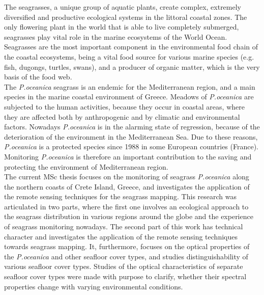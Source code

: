 \documentclass[11pt]{article}
\begin{document}
The seagrasses, a unique group of aquatic plants, create complex, extremely diversified and productive ecological systems in the littoral coastal zones. The only flowering plant in the world that is able to live completely submerged, seagrasses play vital role in the marine ecosystems of the World Ocean. Seagrasses are the most important component in the environmental food chain of the coastal ecosystems, being a vital food source for various marine species (e.g. fish, dugongs, turtles, swans), and a producer of organic matter, which is the very basis of the food web.\\
The \textit{P.oceanica} seagrass is an endemic for the Mediterranean region, and a main species in the marine coastal environment of Greece. Meadows of \textit{P.oceanica} are subjected to the human activities, because they occur in coastal areas, where they are affected both by anthropogenic and by climatic and environmental factors. Nowadays \textit{P.oceanica} is in the alarming state of regression, because of the deterioration of the environment in the Mediterranean Sea. Due to these reasons, \textit{P.oceanica} is a protected species since 1988 in some European countries (France). Monitoring \textit{P.oceanica} is therefore an important contribution to the saving and protecting the environment of Mediterranean region.\\
The current MSc thesis focuses on the monitoring of seagrass \textit{P.oceanica} along the northern coasts of Crete Island, Greece, and investigates the application of the remote sensing techniques for the seagrass mapping. 
This research was articulated in two parts, where the first one involves an ecological approach to the seagrass distribution in various regions around the globe and the experience of seagrass monitoring nowadays. The second part of this work has technical character and investigates the application of the remote sensing techniques towards seagrass mapping. It, furthermore, focuses on the optical properties of the \textit{P.oceanica} and other seafloor cover types, and studies distinguishability of various seafloor cover types. Studies of the optical characteristics of separate seafloor cover types were made with purpose to clarify, whether their spectral properties change with varying environmental conditions. \\
\end{document}
